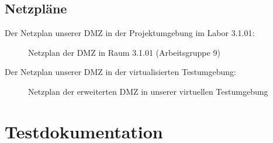 

\clearpage



\clearpage

\subsection{Netzpläne}
\label{app:Netzplan}
Der Netzplan unserer DMZ in der Projektumgebung im Labor 3.1.01:
\begin{figure}[htb]
\centering
{}
\caption{Netzplan der DMZ in Raum 3.1.01 (Arbeitsgruppe 9)}
\end{figure}

Der Netzplan unserer DMZ in der virtualisierten Testumgebung:
\begin{figure}[htb]
    \centering
    \caption{Netzplan der erweiterten DMZ in unserer virtuellen Testumgebung}
\end{figure}
\clearpage



\clearpage

\section{Testdokumentation}
\label{app:Test}



